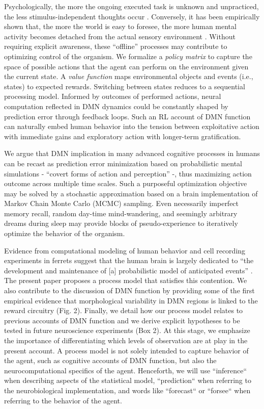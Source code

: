 \documentclass[10pt,letterpaper]{article}
\begin{document}
Psychologically,
the more the ongoing executed task is unknown and unpracticed,
the less stimulus-independent thoughts occur
\citep{filler1973daydreaming, teasdale1995stimulus, christoff2016mind}.
Conversely,
it has been empirically shown that, the more the world is easy to foresee,
the more human mental activity
becomes detached from the actual sensory environment
\citep{antrobus1966studies, pope1978regulation, mason2007, weiss2006}.
Without requiring explicit awareness,
these ``offline'' processes may contribute
to optimizing control of the organism.
We formalize
a \textit{policy matrix} to capture the space of possible actions that
the agent can perform
on the environment given the current state. A \textit{value function}
maps environmental objects and events (i.e., states) to expected rewards.
Switching between states reduces to a sequential processing model.
Informed by outcomes of performed actions, neural computation reflected in
DMN dynamics could be constantly shaped by prediction error through feedback loops.
Such an RL account of DMN function can naturally embed human behavior
into the tension between exploitative action with immediate gains and
exploratory action with longer-term gratification.

We argue that DMN implication in many
advanced cognitive processes in humans
can be recast as prediction error minimization
based on probabilistic mental simulations
- ``covert forms of action and perception'' \citep{pezzulo2011grounding} -,
thus maximizing action outcome across multiple time scales.
Such a purposeful optimization objective
may be solved by a stochastic approximation
based on a brain implementation of Markov Chain Monte Carlo (MCMC) sampling.
Even necessarily imperfect memory recall,
random day-time mind-wandering, and
seemingly arbitrary dreams during sleep
may provide blocks of pseudo-experience to iteratively
optimize the behavior of the organism.

Evidence from computational modeling of human behavior \citep{kording2004bayesian} and cell recording experiments in ferrets \citep{fiser2004small} suggest that
the human brain is largely dedicated to
``the development and maintenance of [a]
probabilistic model of anticipated events''
\citep{raichle2005intrinsic}.
The present paper proposes a
process model that satisfies this contention.
We also contribute to the discussion of DMN function
by providing some of the first empirical evidence that
morphological variability in DMN regions
is linked to the reward circuitry (Fig. 2).
Finally, we detail how our process model relates
to previous accounts of DMN function and
we derive explicit hypotheses to be tested in future neuroscience
experiments (Box 2).
At this stage, we emphasize the importance of differentiating which levels of observation are at play in the present account. A process model is not solely intended to capture behavior of the agent, such as cognitive accounts of DMN function, but also the neurocomputational specifics of the agent. Henceforth, we will use ``inference`` when describing aspects of the statistical model, ``prediction`` when referring to the neurobiological implementation, and words like ``forecast`` or ``forsee`` when referring to the behavior of the agent.
\end{document}
